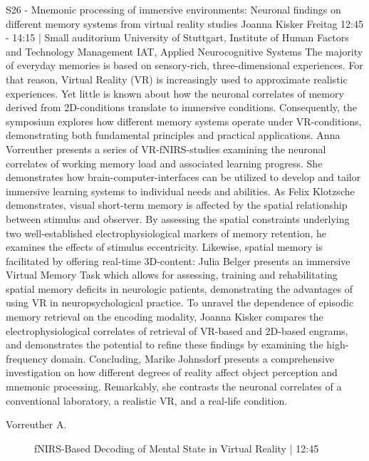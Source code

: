 
            \begin{symposium}
            {S26 - Mnemonic processing of immersive environments: Neuronal findings on different memory systems from virtual reality studies }
            { Joanna Kisker }
            {Freitag 12:45 - 14:15 | Small auditorium}
            {University of Stuttgart, Institute of Human Factors and Technology Management IAT, Applied Neurocognitive Systems}
            The majority of everyday memories is based on sensory-rich, three-dimensional experiences. For that reason, Virtual Reality (VR) is increasingly used to approximate realistic experiences. Yet little is known about how the neuronal correlates of memory derived from 2D-conditions translate to immersive conditions. Consequently, the symposium explores how different memory systems operate under VR-conditions, demonstrating both fundamental principles and practical applications. 
Anna Vorreuther presents a series of VR-fNIRS-studies examining the neuronal correlates of working memory load and associated learning progress. She demonstrates how brain-computer-interfaces can be utilized to develop and tailor immersive learning systems to individual needs and abilities. 
As Felix Klotzsche demonstrates, visual short-term memory is affected by the spatial relationship between stimulus and observer. By assessing the spatial constraints underlying two well-established electrophysiological markers of memory retention, he examines the effects of stimulus eccentricity. 
Likewise, spatial memory is facilitated by offering real-time 3D-content: Julia Belger presents an immersive Virtual Memory Task which allows for assessing, training and rehabilitating spatial memory deficits in neurologic patients, demonstrating the advantages of using VR in neuropsychological practice.
To unravel the dependence of episodic memory retrieval on the encoding modality, Joanna Kisker compares the electrophysiological correlates of retrieval of VR-based and 2D-based engrams, and demonstrates the potential to refine these findings by examining the high-frequency domain.
Concluding, Marike Johnsdorf presents a comprehensive investigation on how different degrees of reality affect object perception and mnemonic processing. Remarkably, she contrasts the neuronal correlates of a conventional laboratory, a realistic VR, and a real-life condition.
            \begin{description}    
            
                \item [ Vorreuther A.] fNIRS-Based Decoding of Mental State in Virtual Reality \textcolor{mygray}{ | 12:45}    
                

\end{description}
\end{symposium}
